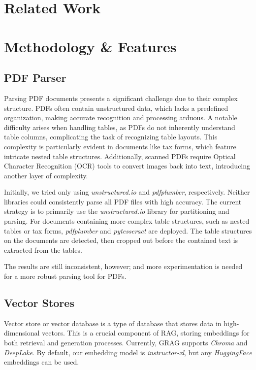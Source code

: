 \documentclass{scrartcl}
\begin{document}

\section{Related Work}


\section{Methodology & Features}

\subsection {PDF Parser}
Parsing PDF documents presents a significant challenge due to their complex structure. PDFs often contain unstructured data, which lacks a predefined organization, making accurate recognition and processing arduous. A notable difficulty arises when handling tables, as PDFs do not inherently understand table columns, complicating the task of recognizing table layouts. This complexity is particularly evident in documents like tax forms, which feature intricate nested table structures. Additionally, scanned PDFs require Optical Character Recognition (OCR) tools to convert images back into text, introducing another layer of complexity.

Initially, we tried only using \textit{unstructured.io} and \textit{pdfplumber}, respectively. Neither libraries could consistently parse all PDF files with high accuracy.
The current strategy is to primarily use the \textit{unstructured.io} library for partitioning and parsing.
For documents containing more complex table structures, such as nested tables or tax forms, \textit{pdfplumber} and \textit{pytesseract} are deployed.
The table structures on the documents are detected, then cropped out before the contained text is extracted from the tables.

The results are still inconsistent, however; and more experimentation is needed for a more robust parsing tool for PDFs.

\subsection{Vector Stores}

Vector store or vector database is a type of database that stores data in high-dimensional vectors. This is a crucial component of RAG, storing embeddings for both retrieval and generation processes.
Currently, GRAG supports \textit{Chroma} and \textit{DeepLake}. By default, our embedding model is \textit{instructor-xl}, but any \textit{HuggingFace} embeddings can be used.
\end{document}
